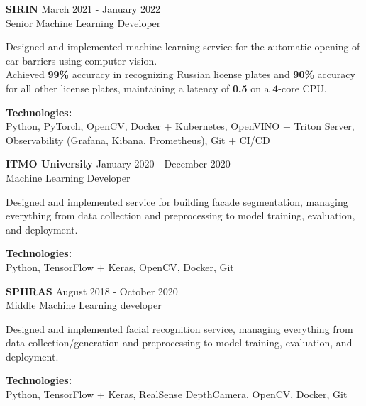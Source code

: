 \textbf{SIRIN} \hfill March 2021 - January 2022 \\
Senior Machine Learning Developer

Designed and implemented machine learning service for the automatic opening of car barriers using computer vision. \\
Achieved \textbf{99\%} accuracy in recognizing Russian license plates and \textbf{90\%} accuracy for all other license plates, maintaining a latency of \textbf{0.5} on a \textbf{4}-core CPU.

\textbf{Technologies:} \\
Python, PyTorch, OpenCV, Docker + Kubernetes, OpenVINO + Triton Server, Observability (Grafana, Kibana, Prometheus), Git + CI/CD

\textbf{ITMO University} \hfill January 2020 - December 2020 \\
Machine Learning Developer

Designed and implemented service for building facade segmentation, managing everything from data collection and preprocessing to model training, evaluation, and deployment.

\textbf{Technologies:} \\
Python, TensorFlow + Keras, OpenCV, Docker, Git

\textbf{SPIIRAS} \hfill August 2018 - October 2020 \\
Middle Machine Learning developer

Designed and implemented facial recognition service, managing everything from data collection/generation and preprocessing to model training, evaluation, and deployment.

\textbf{Technologies:} \\
Python, TensorFlow + Keras, RealSense DepthCamera, OpenCV, Docker, Git

\endinput
